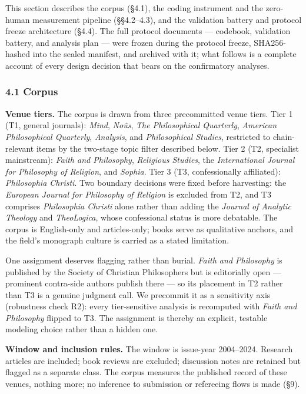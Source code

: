 This section describes the corpus (\S{}4.1), the coding instrument and the zero-human measurement pipeline (\S{}\S{}4.2--4.3), and the validation battery and protocol freeze architecture (\S{}4.4). The full protocol documents --- codebook, validation battery, and analysis plan --- were frozen during the protocol freeze, SHA256-hashed into the sealed manifest, and archived with it; what follows is a complete account of every design decision that bears on the confirmatory analyses.

\subsubsection{4.1 Corpus}\label{corpus}

\textbf{Venue tiers.} The corpus is drawn from three precommitted venue tiers. Tier 1 (T1, general journals): \emph{Mind}, \emph{Noûs}, \emph{The Philosophical Quarterly}, \emph{American Philosophical Quarterly}, \emph{Analysis}, and \emph{Philosophical Studies}, restricted to chain-relevant items by the two-stage topic filter described below. Tier 2 (T2, specialist mainstream): \emph{Faith and Philosophy}, \emph{Religious Studies}, the \emph{International Journal for Philosophy of Religion}, and \emph{Sophia}. Tier 3 (T3, confessionally affiliated): \emph{Philosophia Christi}. Two boundary decisions were fixed before harvesting: the \emph{European Journal for Philosophy of Religion} is excluded from T2, and T3 comprises \emph{Philosophia Christi} alone rather than adding the \emph{Journal of Analytic Theology} and \emph{TheoLogica}, whose confessional status is more debatable. The corpus is English-only and articles-only; books serve as qualitative anchors, and the field's monograph culture is carried as a stated limitation.

One assignment deserves flagging rather than burial. \emph{Faith and Philosophy} is published by the Society of Christian Philosophers but is editorially open --- prominent contra-side authors publish there --- so its placement in T2 rather than T3 is a genuine judgment call. We precommit it as a sensitivity axis (robustness check R2): every tier-sensitive analysis is recomputed with \emph{Faith and Philosophy} flipped to T3. The assignment is thereby an explicit, testable modeling choice rather than a hidden one.

\textbf{Window and inclusion rules.} The window is issue-year 2004--2024. Research articles are included; book reviews are excluded; discussion notes are retained but flagged as a separate class. The corpus measures the published record of these venues, nothing more; no inference to submission or refereeing flows is made (\S{}9).

